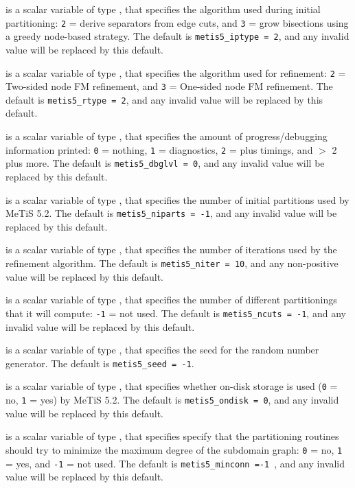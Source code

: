 \documentclass{galahad}
\begin{document}
\begin{description}
 is a scalar variable of type \integer, that specifies
the algorithm used during initial partitioning:
 {\tt 2} = derive separators from edge cuts, and
 {\tt 3} = grow bisections using a greedy node-based strategy.
The default is {\tt metis5\_iptype = 2}, and any invalid value will be
replaced by this default.

 is a scalar variable of type \integer, that specifies
the algorithm used for refinement: {\tt 2} = Two-sided node FM refinement,
 and {\tt 3} = One-sided node FM refinement.
The default is {\tt metis5\_rtype = 2}, and any invalid value will be
replaced by this default.

 is a scalar variable of type \integer, that specifies
the amount of progress/debugging information printed: {\tt 0} = nothing, 
 {\tt 1} = diagnostics, {\tt 2} = plus timings, and $>$ 2 plus more.
The default is {\tt metis5\_dbglvl = 0}, and any invalid value will be
replaced by this default.

 is a scalar variable of type \integer, that specifies
the number of initial partitions used by MeTiS 5.2.
The default is {\tt metis5\_niparts = -1}, and any invalid value will be
replaced by this default.

 is a scalar variable of type \integer, that specifies
the number of iterations used by the refinement algorithm.
The default is {\tt metis5\_niter = 10}, and any non-positive value will be
replaced by this default.

 is a scalar variable of type \integer, that specifies
the number of different partitionings that it will compute: {\tt -1} = not used.
The default is {\tt metis5\_ncuts = -1}, and any invalid value will be
replaced by this default.

 is a scalar variable of type \integer, that specifies
the seed for the random number generator.
The default is {\tt metis5\_seed = -1}.

 is a scalar variable of type \integer, that specifies
whether on-disk storage is used ({\tt 0} = no, {\tt 1} = yes) by MeTiS 5.2.
The default is {\tt metis5\_ondisk = 0}, and any invalid value will be
replaced by this default.

 is a scalar variable of type \integer, that specifies
specify that the partitioning routines should try to minimize the maximum 
degree of the subdomain graph: {\tt 0} = no, {\tt 1} = yes, and 
{\tt -1} = not used. 
The default is {\tt metis5\_minconn =-1  }, and any invalid value will be
replaced by this default.


\end{description}
\end{document}
